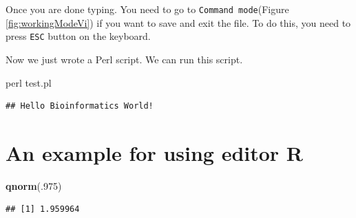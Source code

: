 \documentclass[]{book}
\makeatletter
\newenvironment{Shaded}{\begin{snugshade}}{\end{snugshade}}
\newcommand{\DecValTok}[1]{\textcolor[rgb]{0.00,0.00,0.81}{#1}}
\newcommand{\FunctionTok}[1]{\textcolor[rgb]{0.00,0.00,0.00}{#1}}
\newcommand{\KeywordTok}[1]{\textcolor[rgb]{0.13,0.29,0.53}{\textbf{#1}}}
\newcommand{\NormalTok}[1]{#1}
\newenvironment{kframe}{%
\medskip{}
\setlength{\fboxsep}{.8em}
 \def\at@end@of@kframe{}%
 \ifinner\ifhmode%
  \def\at@end@of@kframe{\end{minipage}}%
  \begin{minipage}{\columnwidth}%
 \fi\fi%
 \def\FrameCommand##1{\hskip\@totalleftmargin \hskip-\fboxsep
 \colorbox{shadecolor}{##1}\hskip-\fboxsep
     \hskip-\linewidth \hskip-\@totalleftmargin \hskip\columnwidth}%
 \MakeFramed {\advance\hsize-\width
   \@totalleftmargin\z@ \linewidth\hsize
   \@setminipage}}%
 {\par\unskip\endMakeFramed%
 \at@end@of@kframe}
\renewenvironment{Shaded}{\begin{kframe}}{\end{kframe}}
\makeatother
\begin{document}
Once you are done typing. You need to go to \texttt{Command\ mode}(Figure \ref{fig:workingModeVi}) if you want to save and exit the file. To do this, you need to press \texttt{ESC} button on the keyboard.

Now we just wrote a Perl script. We can run this script.

\begin{Shaded}
\begin{Highlighting}[]
\FunctionTok{perl}\NormalTok{ test.pl}
\end{Highlighting}
\end{Shaded}

\begin{verbatim}
## Hello Bioinformatics World!
\end{verbatim}

\hypertarget{an-example-for-using-editor-r}{%
\section{An example for using editor R}\label{an-example-for-using-editor-r}}

\begin{Shaded}
\begin{Highlighting}[]
\KeywordTok{qnorm}\NormalTok{(.}\DecValTok{975}\NormalTok{)}
\end{Highlighting}
\end{Shaded}

\begin{verbatim}
## [1] 1.959964
\end{verbatim}
\end{document}
